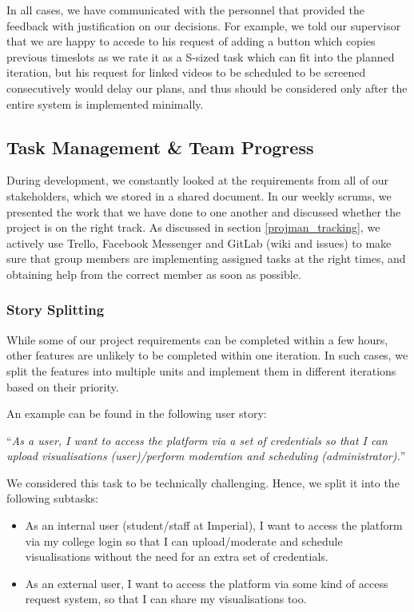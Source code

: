 \documentclass[a4paper, titlepage]{article}
\begin{document}
In all cases, we have communicated with the personnel that provided the
feedback with justification on our decisions. For example, we told
our supervisor that we are happy to accede to his request of adding a button which copies previous timeslots as we rate it as a S-sized task which can fit into the planned iteration, but his request for linked videos to be scheduled to be screened consecutively would delay our plans, and thus should be considered only after the entire system is implemented minimally.




\subsection{Task Management \& Team Progress}
During development, we constantly looked at the requirements from all of our stakeholders, which we stored in a shared document. In our weekly scrums, we presented the work that we have done to one another and discussed whether the project is on the right track. As discussed in section \ref{projman_tracking}, we actively use Trello, Facebook Messenger and GitLab (wiki and issues) to make sure that group members are implementing assigned tasks at the right times, and obtaining help from the correct member as soon as possible.

\subsubsection{Story Splitting}

While some of our project requirements can be completed within a few hours, other features are unlikely to be completed within one iteration. In such cases, we split the features into multiple units and implement them in different iterations based on their priority.

An example can be found in the following user story:
\begin{center}
``\textit{As a user, I want to access the platform via a set of credentials so that I can upload visualisations (user)/perform moderation and scheduling (administrator).}'' \\
\end{center}

We considered this task to be technically challenging. Hence, we split it into the following subtasks:

\begin{itemize}

  \item As an internal user (student/staff at Imperial), I want to access the platform via my college login so that I can upload/moderate and schedule visualisations without the need for an extra set of credentials.

  \item As an external user, I want to access the platform via some kind of access request system, so that I can share my visualisations too.

\end{itemize}
\end{document}
